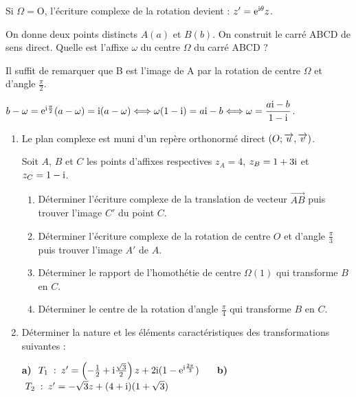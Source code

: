 \medskip

Si  $ \Omega= $O, l'écriture complexe de la rotation devient : $ z'=\mathrm{e}^{\text{i} \theta}z  $.

\medskip
\begin{example}
On donne deux points distincts $A(a)$ et $B(b)$. On construit le carré ABCD de sens
direct. Quelle est l'affixe $ \omega $ du centre $ \Omega $ du carré ABCD ?


Il suffit de remarquer que B est l'image de A par la rotation de centre $ \Omega $ et d'angle $ \frac{\pi}{2} $.

 $ b-\omega =\mathrm{e}^{\text{i} \frac{\pi}{2}}(a-\omega)=\text{i} (a-\omega)\Longleftrightarrow \omega(1-\text{i})=a\text{i}-b\Longleftrightarrow \omega=\dfrac{a\text{i}-b}{1-\text{i}}$.
 
\end{example}
 \begin{exercice}
 \begin{enumerate}
 \item 
 Le plan complexe est muni d'un repère orthonormé direct $ (O ;\overrightarrow{u},\overrightarrow{v}) $.
 \medskip
 
 Soit $A$, $B$ et $C$ les points d'affixes respectives $z_A = 4$,  $z_B = 1 + 3\text{i}$ et $z_C = 1 -\text{i} $.

 \begin{enumerate}
 \item   
 Déterminer l'écriture complexe de la translation   de vecteur $ \overrightarrow{AB}$ puis trouver l'image $ C' $ du  point  $ C $.
 \item Déterminer l'écriture complexe de la rotation   de centre $ O $  et d'angle $ \frac{\pi}{3} $  puis trouver l'image $ A' $ de  $ A $.
 \item Déterminer le rapport de l'homothétie de centre $ \Omega (1) $   qui transforme  $ B$     en $C $.
  \item Déterminer le centre de la rotation d'angle $ \frac{\pi}{4} $ qui transforme  $ B$     en $C $.
 \end{enumerate}
 \item  Déterminer la nature et  les éléments caractéristiques des transformations suivantes :
 
 \textbf{a)}  $ \;T_1\;: \:z'=\left(-\tfrac{1}{2} +\text{i} \tfrac{\sqrt{3}}{2}\right)z +2\text{i}(1-\mathrm{e}^{\text{i}\frac{2\pi}{3}}) \hspace*{0.5cm}$  \textbf{b)} $\; T_2\;: \:z'= -\sqrt{3}z +(4+\text{i})(1+\sqrt{3})$
 \end{enumerate}
 \end{exercice}
 
